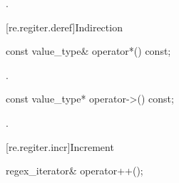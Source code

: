 \begin{itemdescr}
\pnum\returns {}.
\end{itemdescr}

[re.regiter.deref]{Indirection}

%
\begin{itemdecl}
const value_type& operator*() const;
\end{itemdecl}

\begin{itemdescr}
\pnum\returns {}.
\end{itemdescr}

%
\begin{itemdecl}
const value_type* operator->() const;
\end{itemdecl}

\begin{itemdescr}
\pnum\returns {}.
\end{itemdescr}

[re.regiter.incr]{Increment}

%
%
\begin{itemdecl}
regex_iterator& operator++();
\end{itemdecl}


